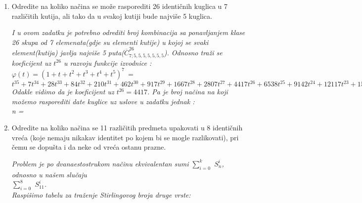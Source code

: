 \documentclass[12pt]{article}
\begin{document}
\begin{enumerate}
\begin{center}
{		\vspace{0.15cm}
		\\$t^{15} + 5 t^{14} + 14 t^{13} + 30 t^{12} + 52 t^{11} + 76 t^{10} + 97 t^9 + 109 t^8 + 109 t^7 + 97 t^6 + 76 t^5 + 52 t^4 + 30 t^3 + 14 t^2 + 5 t + 1$\\
		\vspace{0.20cm} Nas interesuje član uz $t^6$, pa je traženi rezultat 
		}
	    \end{center}
	    \newpage
		\item Odredite na koliko načina se može rasporediti 26 identičnih kuglica u 7 različitih kutija, ali tako da u svakoj kutiji bude najviše 5 kuglica.
		\begin{center}
		\textit{I u ovom zadatku je potrebno odrediti broj kombinacija sa ponavljanjem klase 26 skupa od 7 elemenata(gdje su elementi kutije) u kojoj se svaki element(kutija) javlja najviše 5 puta($\overline{C}^{26}_{7;5, 5, 5, 5, 5,5,5}$). Odnosno traži se koeficijent uz $t^{26}$ u razvoju funkcije izvodnice :\\ 
		\vspace{0.15cm}
		$\varphi(t) = (1+t+t^2+t^3+t^4+t^5)^7 \ = \ $
		\\
		\vspace{0.15cm}
		$t^{35} + 7 t^{34} + 28 t^{33} + 84 t^{32} + 210 t^{31} + 462 t^{30} + 917 t^{29} + 1667 t^{28} + 2807 t^{27} + 4417 t^{26} + 6538 t^{25} + 9142 t^{24} + 12117 t^{23} + 15267 t^{22} + 18327 t^{21} + 20993 t^{20} + 22967 t^{19} + 24017 t^{18} + 24017 t^{17} + 22967 t^{16} + 20993 t^{15} + 18327 t^{14} + 15267 t^{13} + 12117 t^{12} + 9142 t^{11} + 6538 t^{10} + 4417 t^9 + 2807 t^8 + 1667 t^7 + 917 t^6 + 462 t^5 + 210 t^4 + 84 t^3 + 28 t^2 + 7 t + 1$
		\\ \vspace{0.15cm}
		Odakle vidimo da je koeficijent uz $t^{26} = 4417$. Pa je broj načina na koji možemo rasporediti date kuglice uz uslove u zadatku jednak :
		\\
		\vspace{0.15cm} n = 
		}
	    \end{center}
		\item Odredite na koliko načina se 11 različitih predmeta upakovati u 8 identičnih vreća (koje nemaju nikakav identitet po kojem bi se mogle razlikovati), pri čemu se dopušta i da neke od vreća ostanu prazne.
		\begin{center}
		\textit{Problem je po dvanaestostrukom načinu ekvivalentan sumi $\sum^k_{i=0}$ $S^i_n$, odnosno u našem slučaju \\$\sum^8_{i=0}$ $S^i_{11}$. \\Raspišimo tabelu za traženje Stirlingovog broja druge vrste:\\}

\end{center}
\end{enumerate}
\end{document}
